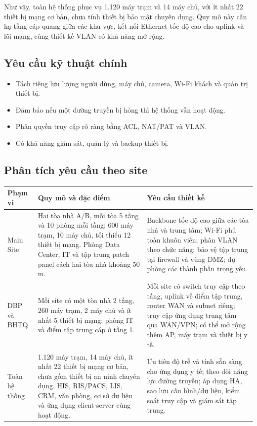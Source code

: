 Như vậy, toàn hệ thống phục vụ 1.120 máy trạm và 14 máy chủ, với ít nhất 22 thiết bị mạng cơ bản, chưa tính thiết bị bảo mật chuyên dụng. Quy mô này cần hạ tầng cáp quang giữa các khu vực, kết nối Ethernet tốc độ cao cho uplink và lõi mạng, cùng thiết kế VLAN có khả năng mở rộng.

\subsection{Yêu cầu kỹ thuật chính}

\begin{itemize}
    \item Tách riêng lưu lượng người dùng, máy chủ, camera, Wi-Fi khách và quản trị thiết bị.
    \item Đảm bảo nếu một đường truyền bị hỏng thì hệ thống vẫn hoạt động.
    \item Phân quyền truy cập rõ ràng bằng ACL, NAT/PAT và VLAN.
    \item Có khả năng giám sát, quản lý và backup thiết bị.
\end{itemize}

\subsection{Phân tích yêu cầu theo site}

\begin{tabularx}{\textwidth}{|X|X|X|}
\hline
\textbf{Phạm vi} & \textbf{Quy mô và đặc điểm} & \textbf{Yêu cầu thiết kế} \\
\hline
Main Site & Hai tòa nhà A/B, mỗi tòa 5 tầng và 10 phòng mỗi tầng; 600 máy trạm, 10 máy chủ, tối thiểu 12 thiết bị mạng. Phòng Data Center, IT và tập trung patch panel cách hai tòa nhà khoảng 50 m. & Backbone tốc độ cao giữa các tòa nhà và trung tâm; Wi-Fi phủ toàn khuôn viên; phân VLAN theo chức năng; bảo vệ tập trung tại firewall và vùng DMZ; dự phòng các thành phần trọng yếu. \\
\hline
DBP và BHTQ & Mỗi site có một tòa nhà 2 tầng, 260 máy trạm, 2 máy chủ và ít nhất 5 thiết bị mạng; phòng IT và điểm tập trung cáp ở tầng 1. & Mỗi site có switch truy cập theo tầng, uplink về điểm tập trung, router WAN và subnet riêng; truy cập ứng dụng trung tâm qua WAN/VPN; có thể mở rộng thêm AP, máy trạm và thiết bị y tế. \\
\hline
Toàn hệ thống & 1.120 máy trạm, 14 máy chủ, ít nhất 22 thiết bị mạng cơ bản, chưa gồm thiết bị an ninh chuyên dụng. HIS, RIS/PACS, LIS, CRM, văn phòng, cơ sở dữ liệu và ứng dụng client-server cùng hoạt động. & Ưu tiên độ trễ và tính sẵn sàng cho ứng dụng y tế; theo dõi năng lực đường truyền; áp dụng HA, sao lưu cấu hình/dữ liệu, kiểm soát truy cập và giám sát tập trung. \\
\hline
\end{tabularx}

